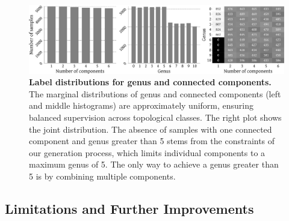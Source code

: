\begin{figure}[t!]
  \centering
  \includegraphics[width=\linewidth]{figs/topogen/label_distribution.pdf}
  \caption{\textbf{Label distributions for genus and connected components.} The marginal distributions of genus and connected components (left and middle histograms) are approximately uniform, ensuring balanced supervision across topological classes. The right plot shows the joint distribution. The absence of samples with one connected component and genus greater than 5 stems from the constraints of our generation process, which limits individual components to a maximum genus of 5. The only way to achieve a genus greater than 5 is by combining multiple components.}
  \label{fig:topogen-properties}
\end{figure}



\subsection{Limitations and Further Improvements}

